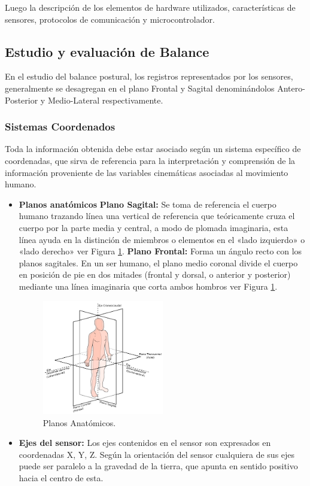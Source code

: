 \documentclass[12pt,a4paper]{article}
\begin{document}
Luego la descripción de los elementos de hardware utilizados, características de sensores, protocolos de comunicación y microcontrolador.


\subsection{Estudio y evaluación de Balance}

En el estudio del balance postural, los registros representados por los sensores, generalmente se desagregan en el plano Frontal y Sagital denominándolos Antero-Posterior y Medio-Lateral respectivamente. 

\subsubsection{Sistemas Coordenados}

Toda la información obtenida debe estar asociado según un sistema específico de coordenadas, que sirva de referencia para la interpretación y comprensión de la información proveniente de las variables cinemáticas asociadas al movimiento humano.

\begin{itemize}
	
	\item \textbf{Planos anatómicos} 
	\subitem \textbf{Plano Sagital:}
	Se toma de referencia el cuerpo humano trazando línea una  vertical de referencia que teóricamente cruza el cuerpo por la parte media y central, a modo de plomada imaginaria, esta línea ayuda en la distinción de miembros o elementos en el «lado izquierdo» o «lado derecho» ver Figura \ref{fig:sagital}.
	\subitem \textbf{Plano Frontal:} Forma un ángulo recto con los planos sagitales. En un ser humano, el plano medio coronal divide el cuerpo en posición de pie en dos mitades (frontal y dorsal, o anterior y posterior) mediante una línea imaginaria que corta ambos hombros ver Figura \ref{fig:sagital}.
	
	\begin{figure}[H]
		\centering
		\includegraphics[width=0.5\textwidth]{images/planosAnatomicos}
		\caption{Planos Anatómicos.}
		\label{fig:sagital}
	\end{figure}
	
	\item \textbf{Ejes del sensor:} Los ejes contenidos en el sensor son expresados en coordenadas X, Y, Z.
	Según la orientación del sensor cualquiera de sus ejes puede ser paralelo a la gravedad de la tierra, que apunta en sentido positivo hacia el centro de esta.
\end{itemize}
\end{document}
